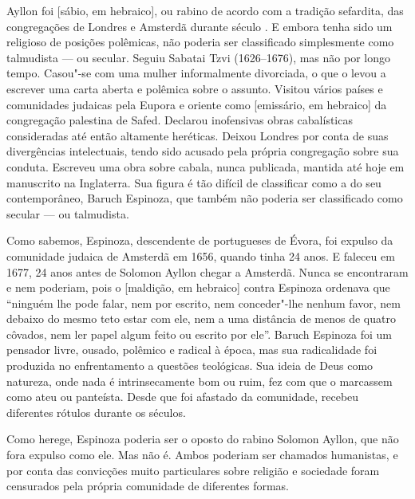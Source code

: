 \begin{multicols}{2}
Ayllon foi {} [sábio, em hebraico], ou rabino de acordo com a tradição sefardita, das congregações de Londres e Amsterdã durante século . E embora tenha sido um religioso de posições polêmicas, não poderia ser classificado simplesmente como talmudista --- ou secular. Seguiu Sabatai Tzvi (1626--1676), mas não por longo tempo. Casou"-se com uma mulher informalmente divorciada, o que o levou a escrever uma carta aberta e polêmica sobre o assunto. Visitou vários países e
comunidades judaicas pela Eupora e oriente como {} [emissário, em hebraico] da congregação palestina de Safed. Declarou inofensivas obras cabalísticas consideradas até então altamente heréticas. Deixou Londres por conta de suas divergências intelectuais, tendo sido acusado pela própria congregação sobre sua conduta. Escreveu uma obra sobre cabala, nunca publicada, mantida até hoje em manuscrito na Inglaterra. Sua figura é tão difícil de classificar como a do seu contemporâneo, Baruch Espinoza, que também não poderia ser classificado como secular --- ou talmudista.

\bigskip

{}

\bigskip

Como sabemos, Espinoza, descendente de portugueses de Évora, foi expulso da comunidade judaica de Amsterdã em 1656, quando tinha 24 anos. E faleceu em 1677, 24 anos antes de Solomon Ayllon chegar a Amsterdã. Nunca se encontraram e nem poderiam, pois o {} [maldição, em hebraico] contra Espinoza ordenava que ``ninguém lhe pode falar, nem por escrito, nem conceder"-lhe nenhum favor, nem debaixo do mesmo teto estar com ele, nem a uma distância de menos de quatro côvados, nem ler papel algum feito ou escrito por ele''. Baruch Espinoza foi um pensador livre, ousado, polêmico e radical à época, mas sua radicalidade foi produzida no enfrentamento a questões teológicas. Sua ideia de Deus como natureza, onde nada é intrinsecamente bom ou ruim, fez com que o marcassem como ateu ou panteísta. Desde que foi afastado da comunidade, recebeu diferentes rótulos durante os séculos. 

Como herege, Espinoza poderia ser o oposto do rabino Solomon Ayllon, que não fora expulso como ele. Mas não é. Ambos poderiam ser chamados humanistas, e por conta das convicções muito particulares sobre religião e sociedade foram censurados pela própria comunidade de diferentes formas. 


\end{multicols}

